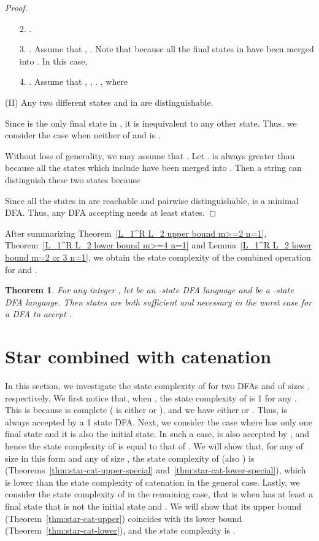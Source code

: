 \documentclass[10pt]{article}
\newtheorem{theorem}{Theorem}
\begin{document}
\begin{proof}
\begin{itemize}
\item[{\rm 2.}]. 
\item[{\rm 3.}].
Assume that , . Note that 
because all the final states in  have been merged into . In
this case, 
\item[{\rm 4.}].
Assume that , , . , where

\end{itemize}

(II) Any two different states  and  in  are
distinguishable.

Since  is the only final state in , it is inequivalent to
any other state. Thus, we consider the case when neither of  and
 is .

Without loss of generality, we may assume that . Let
.  is always greater than  because all the states
which include  have been merged into . Then a string
 can distinguish these two states because

Since all the states in  are reachable and pairwise
distinguishable,  is a minimal DFA. Thus, any DFA accepting
 needs at least  states.
\end{proof}

After summarizing Theorem~\ref{L_1^R L_2 upper bound m>=2 n=1},
Theorem~\ref{L_1^R L_2 lower bound m>=4 n=1} and Lemma~\ref{L_1^R
L_2 lower bound m=2 or 3 n=1}, we obtain the state complexity of the
combined operation  for  and .

\begin{theorem}
\label{L_1^R L_2 state complexity m>=2 n=1} For any integer , let  be an -state DFA language and  be a -state
DFA language. Then  states are both sufficient and
necessary in the worst case for a DFA to accept .
\end{theorem}

\section{Star combined with catenation}\label{sec:star-cat}
In this section, we investigate the state complexity of  for two DFAs  and  of sizes , respectively.
We first notice that, when , the state complexity of  is 1 for any .
This is because  is complete ( is either  or ), and we have either  or .
Thus,  is always accepted by a 1 state DFA.
Next, we consider the case where  has only one final state and it is also the initial state.
In such a case,  is also accepted by , and hence the state complexity of  is equal to that of .
We will show that, for any  of size  in this form and any  of size , the state complexity of  (also ) is  (Theorems~\ref{thm:star-cat-upper-special} and~\ref{thm:star-cat-lower-special}), which is lower than the state complexity of catenation in the general case.
Lastly, we consider the state complexity of  in the remaining case, that is when  has at least a final state that is not the initial state and .
We will show that its upper bound (Theorem~\ref{thm:star-cat-upper}) coincides with its lower bound (Theorem~\ref{thm:star-cat-lower}), and the state complexity is .
\end{document}
